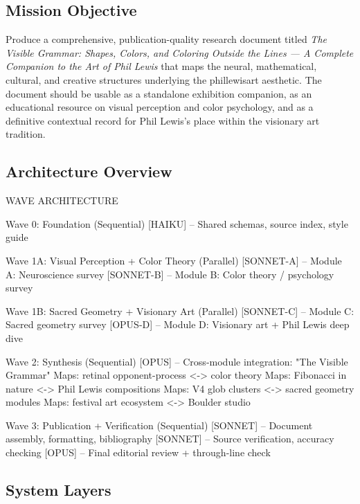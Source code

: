 \documentclass[11pt,letterpaper]{article}
\begin{document}
\subsection{Mission Objective}

Produce a comprehensive, publication-quality research document titled \textit{The Visible Grammar: Shapes, Colors, and Coloring Outside the Lines --- A Complete Companion to the Art of Phil Lewis} that maps the neural, mathematical, cultural, and creative structures underlying the phillewisart aesthetic. The document should be usable as a standalone exhibition companion, as an educational resource on visual perception and color psychology, and as a definitive contextual record for Phil Lewis's place within the visionary art tradition.

\subsection{Architecture Overview}

\begin{asciibox}
WAVE ARCHITECTURE

Wave 0: Foundation (Sequential)
  [HAIKU] -- Shared schemas, source index, style guide

Wave 1A: Visual Perception + Color Theory (Parallel)
  [SONNET-A] -- Module A: Neuroscience survey
  [SONNET-B] -- Module B: Color theory / psychology survey

Wave 1B: Sacred Geometry + Visionary Art (Parallel)
  [SONNET-C] -- Module C: Sacred geometry survey
  [OPUS-D]   -- Module D: Visionary art + Phil Lewis deep dive

Wave 2: Synthesis (Sequential)
  [OPUS] -- Cross-module integration: "The Visible Grammar"
           Maps: retinal opponent-process <-> color theory
           Maps: Fibonacci in nature <-> Phil Lewis compositions
           Maps: V4 glob clusters <-> sacred geometry modules
           Maps: festival art ecosystem <-> Boulder studio

Wave 3: Publication + Verification (Sequential)
  [SONNET] -- Document assembly, formatting, bibliography
  [SONNET] -- Source verification, accuracy checking
  [OPUS]   -- Final editorial review + through-line check
\end{asciibox}

\subsection{System Layers}
\end{document}
